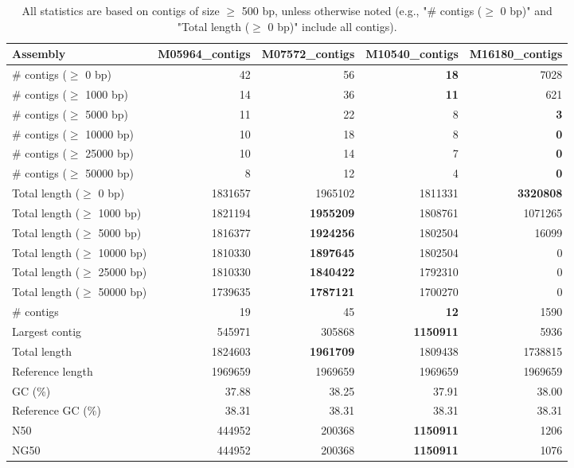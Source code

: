 \documentclass[12pt,a4paper]{article}
\begin{document}
\begin{table}[ht]
\begin{center}
\caption{All statistics are based on contigs of size $\geq$ 500 bp, unless otherwise noted (e.g., "\# contigs ($\geq$ 0 bp)" and "Total length ($\geq$ 0 bp)" include all contigs).}
\begin{tabular}{|l*{4}{|r}|}
\hline
Assembly & M05964\_contigs & M07572\_contigs & M10540\_contigs & M16180\_contigs \\ \hline
\# contigs ($\geq$ 0 bp) & 42 & 56 & {\bf 18} & 7028 \\ \hline
\# contigs ($\geq$ 1000 bp) & 14 & 36 & {\bf 11} & 621 \\ \hline
\# contigs ($\geq$ 5000 bp) & 11 & 22 & 8 & {\bf 3} \\ \hline
\# contigs ($\geq$ 10000 bp) & 10 & 18 & 8 & {\bf 0} \\ \hline
\# contigs ($\geq$ 25000 bp) & 10 & 14 & 7 & {\bf 0} \\ \hline
\# contigs ($\geq$ 50000 bp) & 8 & 12 & 4 & {\bf 0} \\ \hline
Total length ($\geq$ 0 bp) & 1831657 & 1965102 & 1811331 & {\bf 3320808} \\ \hline
Total length ($\geq$ 1000 bp) & 1821194 & {\bf 1955209} & 1808761 & 1071265 \\ \hline
Total length ($\geq$ 5000 bp) & 1816377 & {\bf 1924256} & 1802504 & 16099 \\ \hline
Total length ($\geq$ 10000 bp) & 1810330 & {\bf 1897645} & 1802504 & 0 \\ \hline
Total length ($\geq$ 25000 bp) & 1810330 & {\bf 1840422} & 1792310 & 0 \\ \hline
Total length ($\geq$ 50000 bp) & 1739635 & {\bf 1787121} & 1700270 & 0 \\ \hline
\# contigs & 19 & 45 & {\bf 12} & 1590 \\ \hline
Largest contig & 545971 & 305868 & {\bf 1150911} & 5936 \\ \hline
Total length & 1824603 & {\bf 1961709} & 1809438 & 1738815 \\ \hline
Reference length & 1969659 & 1969659 & 1969659 & 1969659 \\ \hline
GC (\%) & 37.88 & 38.25 & 37.91 & 38.00 \\ \hline
Reference GC (\%) & 38.31 & 38.31 & 38.31 & 38.31 \\ \hline
N50 & 444952 & 200368 & {\bf 1150911} & 1206 \\ \hline
NG50 & 444952 & 200368 & {\bf 1150911} & 1076 \\ \hline

\end{tabular}
\end{center}
\end{table}
\end{document}
